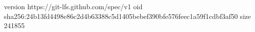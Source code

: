 version https://git-lfs.github.com/spec/v1
oid sha256:24b13fd4498e86c2d4b63388c5d1405bebef390bfe576feec1a59f1cdbf3af50
size 241855
